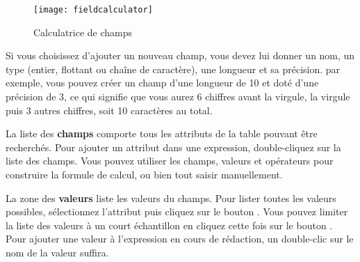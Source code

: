 \begin{figure}[ht]
  \centering
    \texttt{[image: fieldcalculator]}
    \caption{Calculatrice de champs \nixcaption}\label{fig:field_calculator}
\end{figure}

Si vous choisissez d'ajouter un nouveau champ, vous devez lui donner un nom, un type (entier, flottant ou chaîne de caractère), une longueur et sa précision. par exemple, vous pouvez créer un champ d'une longueur de 10 et doté d'une précision de 3, ce qui signifie que vous aurez 6 chiffres avant la virgule, la virgule puis 3 autres chiffres, soit 10 caractères au total.

La liste des \textbf{champs} comporte tous les attributs de la table pouvant être recherchés. Pour ajouter un attribut dans une expression, double-cliquez sur la liste des champs. Vous pouvez utiliser les champs, valeurs et opérateurs pour construire la formule de calcul, ou bien tout saisir manuellement.

La zone des \textbf{valeurs} liste les valeurs du champs. Pour lister toutes les valeurs possibles, sélectionnez l'attribut puis cliquez sur le bouton . Vous pouvez limiter la liste des valeurs à un court échantillon en cliquez cette fois sur le bouton . Pour ajouter une valeur à l'expression en cours de rédaction, un double-clic sur le nom de la valeur suffira.

